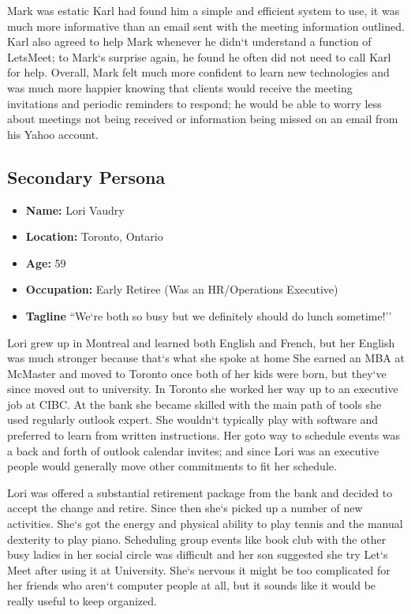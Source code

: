 \documentclass{sigchi}
\begin{document}
Mark was estatic Karl had found him a simple and efficient system to use, it was much more informative than an email sent with the meeting information outlined. Karl also agreed to help Mark whenever he didn`t understand a function of LetsMeet; to Mark`s surprise again, he found he often did not need to call Karl for help. Overall, Mark felt much more confident to learn new technologies and was much more happier knowing that clients would receive the meeting invitations and periodic reminders to respond; he would be able to worry less about meetings not being received or information being missed on an email from his Yahoo account.

\subsection{Secondary Persona}
\begin{itemize}
	\item \textbf{Name:} Lori Vaudry
	\item \textbf{Location:} Toronto, Ontario
	\item \textbf{Age:} 59
	\item \textbf{Occupation:} Early Retiree (Was an HR/Operations Executive)
	\item \textbf{Tagline} ``We`re both so busy but we definitely should do lunch sometime!''
\end{itemize}

Lori grew up in Montreal and learned both English and French, but her English was much stronger because that`s what she spoke at home
She earned an MBA at McMaster and moved to Toronto once both of her kids were born, but they`ve since moved out to university. 
In Toronto she worked her way up to an executive job at CIBC.
At the bank she became skilled with the main path of tools she used regularly outlook expert.
She wouldn`t typically play with software and preferred to learn from written instructions.
Her goto way to schedule events was a back and forth of outlook calendar invites; 
and since Lori was an executive people would generally move other commitments to fit her schedule.
 
Lori was offered a substantial retirement package from the bank and decided to accept the change and retire. 
Since then she`s picked up a number of new activities.
She`s got the energy and physical ability to play tennis and the manual dexterity to play piano.
Scheduling group events like book club with the other busy ladies in her social circle was difficult and her son suggested she try Let`s Meet after using it at University.
She`s nervous it might be too complicated for her friends who aren`t computer people at all, but it sounds like it would be really useful to keep organized.
\end{document}
